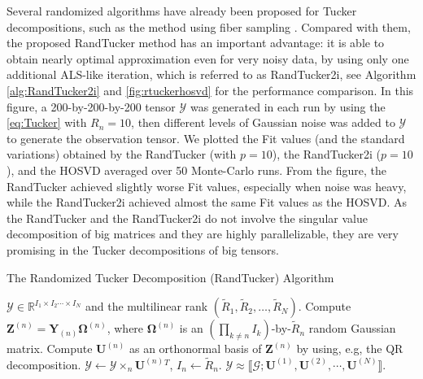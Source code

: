 \documentclass[10pt,twocolumn,twoside]{IEEEtran}
\newcommand{\tensor}[1]{\ensuremath{\boldsymbol{\mathscr{#1}}}}
\newcommand{\tenmat}[2][n]{\ensuremath{{\mathbf{#2}}_{(#1)}}}
\newcommand{\matn}[2][n]{\ensuremath{\mathbf{#2}^{(#1)}}}
\newcommand{\compactTucker}[2]{\ensuremath{\llbracket \tensor{#1}; {\mathbf{#2}}^{(1)}, {\mathbf{#2}}^{(2)}, \cdots, {\mathbf{#2}}^{(N)}\rrbracket}}
\newcommand{\ttmn}[2][n]{\ensuremath{\times_{#1}\matn[#1]{{#2}}}}
\newcommand{\Real}{\ensuremath{\mathbb{R}}}
\renewcommand{\from}{\ensuremath{\leftarrow}}
\begin{document}
Several randomized algorithms have already been proposed for Tucker decompositions, such as the method using fiber sampling \cite{CURTensorCaiafaC2010,spm2014_Incomplete}. Compared with them, the proposed RandTucker method has an important advantage: it is able to obtain nearly optimal approximation even for very noisy data, by using only one additional ALS-like iteration, which is referred to as RandTucker2i, see Algorithm \ref{alg:RandTucker2i} and \figurename \ref{fig:rtuckerhosvd} for the performance comparison. In this figure, a 200-by-200-by-200 tensor \tensor{Y} was generated in each run by using the \eqref{eq:Tucker} with $R_n=10$, then different levels of Gaussian noise was added to \tensor{Y}  to generate the observation tensor. We plotted the Fit values (and the standard variations) obtained by the RandTucker (with $p=10$), the RandTucker2i ($p=10$), and the HOSVD averaged over 50 Monte-Carlo runs. From the figure, the RandTucker achieved slightly worse Fit values, especially when noise  was heavy, while the RandTucker2i achieved almost the same Fit values as the HOSVD. As the RandTucker and the RandTucker2i do not involve the singular value decomposition of big matrices and they are highly parallelizable, they are very promising in the Tucker decompositions of big tensors.



\begin{algorithm}[!t]
\caption{The Randomized Tucker Decomposition (RandTucker) Algorithm}
\label{alg:RandTucker}
\begin{algorithmic}[1]
 \REQUIRE $\tensor{Y}\in\Real^{I_1\times I_2 \cdots \times I_N}$ and the multilinear rank  $(\tilde{R}_1,\tilde{R}_2,\ldots,\tilde{R}_N)$.
\STATE Compute  $\matn{Z}=\tenmat{Y}\matn{\Omega}$, where $\matn{\Omega}$ is an $(\prod_{k\neq n}I_k)$-by-$\tilde{R}_n$ random Gaussian matrix.
\STATE Compute \matn{U} as an orthonormal basis of \matn{Z} by using, e.g, the QR decomposition.
\STATE $\tensor{Y}\from\tensor{Y}\ttmn{U}{}^T$, $I_n\from \tilde{R}_n$.
\ENDFOR
\STATE{\tensor{G}\from\tensor{Y}.}
\RETURN $\tensor{Y}\approx\compactTucker{G}{U}$.
\end{algorithmic}
\end{algorithm} 
\end{document}
